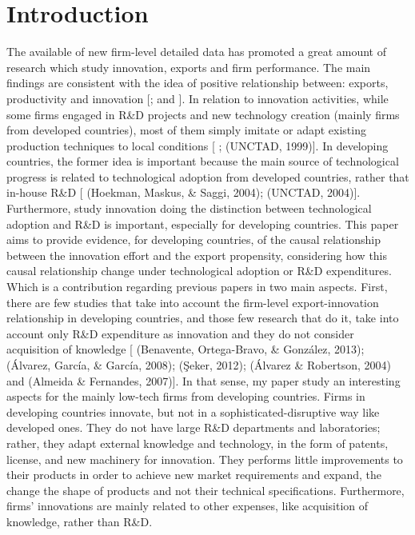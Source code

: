 \section{Introduction}
The available of new firm-level detailed data has promoted a great amount of research which study innovation, exports and firm performance. The main findings are consistent with the idea of positive relationship between: exports, productivity and innovation [\cite{BernardJensen1999}; \cite{CDM} and \cite{LopezRodriguez2005}]. In relation to innovation activities, while some firms engaged in R\&D projects and new technology creation (mainly firms from developed countries), most of them simply imitate or adapt existing production techniques to local conditions [\cite{EvensonWestphal1995} ; (UNCTAD, 1999)]. In developing countries, the former idea is important because the main source of technological progress is related to technological adoption from developed countries, rather that in-house R\&D [ (Hoekman, Maskus, \& Saggi, 2004); (UNCTAD, 2004)]. Furthermore, study innovation doing the distinction between technological adoption and R\&D is important, especially for developing countries. 
This paper aims to provide evidence, for developing countries, of the causal relationship between the innovation effort and the export propensity, considering how this causal relationship change under technological adoption or R\&D expenditures. Which is a contribution regarding previous papers in two main aspects. 
First, there are few studies that take into account the firm-level export-innovation relationship in developing countries, and those few research that do it, take into account only R\&D expenditure as innovation and they do not consider acquisition of knowledge [ (Benavente, Ortega-Bravo, \& González, 2013); (Álvarez, García, \& García, 2008); (Şeker, 2012); (Álvarez \& Robertson, 2004) and (Almeida \& Fernandes, 2007)]. In that sense, my paper study an interesting aspects for the mainly low-tech firms from developing countries. Firms in developing countries innovate, but not in a sophisticated-disruptive way like developed ones. They do not have large R\&D departments and laboratories; rather, they adapt external knowledge and technology, in the form of patents, license, and new machinery for innovation. They performs little improvements to their products in order to achieve new market requirements and expand, the change the shape of products and not their technical specifications. Furthermore, firms’ innovations are mainly related to other expenses, like acquisition of knowledge, rather than R\&D.   



